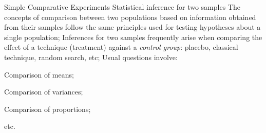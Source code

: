 \documentclass[t]{beamer}
\begin{document}
\begin{frame}[b]
\begin{columns}[T]
\end{columns}
\vhalf
{}
\end{frame}


\begin{ftst}
{Simple Comparative Experiments}
{Statistical inference for two samples}
The concepts of comparison between two populations based on information obtained from their samples follow the same principles used for testing hypotheses about a single population;
\vone
Inferences for two samples frequently arise when comparing the effect of a technique (treatment) against a \textit{control group}: placebo, classical technique, random search, etc;
\vone
Usual questions involve:

\bitems Comparison of means;
\item Comparison of variances;
\item Comparison of proportions;
\item etc.
\eitem
\end{ftst}
\end{document}

